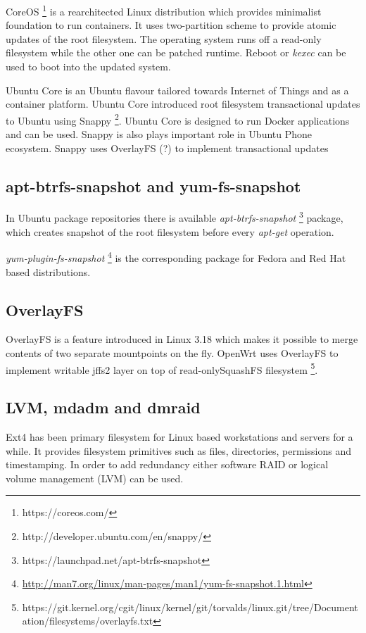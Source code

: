 \documentclass{article}
\begin{document}
CoreOS \footnote{https://coreos.com/} is a rearchitected Linux distribution
which provides minimalist foundation to run containers.
It uses two-partition scheme to provide atomic updates of the root filesystem.
The operating system runs off a read-only filesystem while the other one
can be patched runtime. Reboot or \emph{kexec} can be used to boot into
the updated system.


Ubuntu Core is an Ubuntu flavour tailored towards Internet of Things and as a
container platform. Ubuntu Core introduced root filesystem transactional
updates to Ubuntu using Snappy
\footnote{http://developer.ubuntu.com/en/snappy/}.
Ubuntu Core is designed to run Docker applications and can be used.
Snappy is also plays important role in Ubuntu Phone ecosystem.
Snappy uses OverlayFS (?) to implement transactional updates 

\subsection{apt-btrfs-snapshot and yum-fs-snapshot}

In Ubuntu package repositories there is available \emph{apt-btrfs-snapshot}
\footnote{https://launchpad.net/apt-btrfs-snapshot} package,
which creates snapshot of the root filesystem before every
\emph{apt-get} operation.

\emph{yum-plugin-fs-snapshot}
\footnote{\url{http://man7.org/linux/man-pages/man1/yum-fs-snapshot.1.html}}
is the corresponding package for Fedora and
Red Hat based distributions.


\subsection{OverlayFS}

OverlayFS is a feature introduced in Linux 3.18 which makes it possible to merge contents of two separate mountpoints on the fly.
OpenWrt uses OverlayFS to implement writable jffs2 layer on top of read-onlySquashFS filesystem \footnote{https://git.kernel.org/cgit/linux/kernel/git/torvalds/linux.git/tree/Documentation/filesystems/overlayfs.txt}.

\subsection{LVM, mdadm and dmraid}

Ext4 has been primary filesystem for Linux based workstations and servers for
a while. It provides filesystem primitives such as files, directories,
permissions and timestamping. In order to add redundancy either software RAID
or logical volume management (LVM) can be used.
\end{document}
